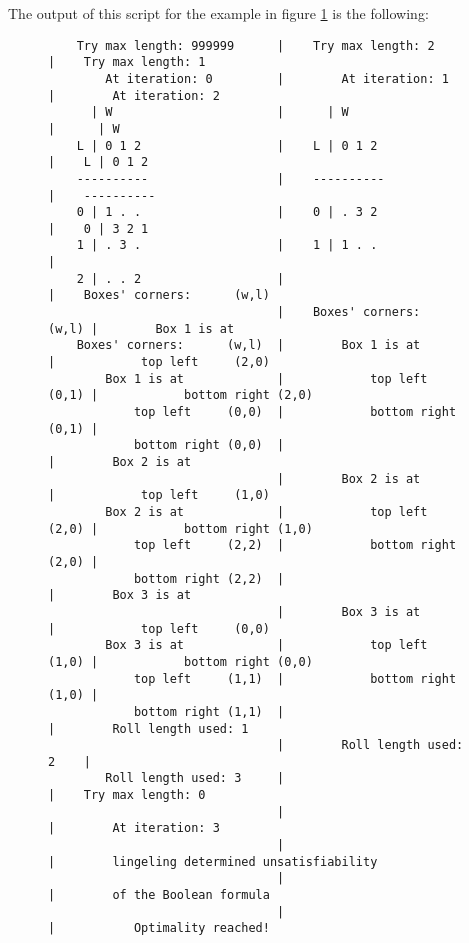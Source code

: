 The output of this script for the example in figure \ref{fig:satisfiability:gov-script}
is the following:
\begin{figure}[H]
\centering
{\scriptsize
\begin{BVerbatim}
    Try max length: 999999      |    Try max length: 2          |    Try max length: 1
        At iteration: 0         |        At iteration: 1        |        At iteration: 2
      | W                       |      | W                      |      | W
    L | 0 1 2                   |    L | 0 1 2                  |    L | 0 1 2 
    ----------                  |    ----------                 |    ----------
    0 | 1 . .                   |    0 | . 3 2                  |    0 | 3 2 1 
    1 | . 3 .                   |    1 | 1 . .                  |    
    2 | . . 2                   |                               |    Boxes' corners:      (w,l)
                                |    Boxes' corners:      (w,l) |        Box 1 is at 
    Boxes' corners:      (w,l)  |        Box 1 is at            |            top left     (2,0)
        Box 1 is at             |            top left     (0,1) |            bottom right (2,0)
            top left     (0,0)  |            bottom right (0,1) |    
            bottom right (0,0)  |                               |        Box 2 is at 
                                |        Box 2 is at            |            top left     (1,0)
        Box 2 is at             |            top left     (2,0) |            bottom right (1,0)
            top left     (2,2)  |            bottom right (2,0) |    
            bottom right (2,2)  |                               |        Box 3 is at 
                                |        Box 3 is at            |            top left     (0,0)
        Box 3 is at             |            top left     (1,0) |            bottom right (0,0)
            top left     (1,1)  |            bottom right (1,0) |    
            bottom right (1,1)  |                               |        Roll length used: 1
                                |        Roll length used: 2    |
        Roll length used: 3     |                               |    Try max length: 0
                                |                               |        At iteration: 3
                                |                               |        lingeling determined unsatisfiability
                                |                               |        of the Boolean formula
                                |                               |           Optimality reached!
\end{BVerbatim}
}
\label{fig:satisfiability:gov-script}
\end{figure}
